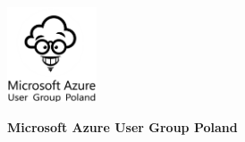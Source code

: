 \documentclass[\main/boa.tex]{subfiles}
\begin{document}
	
	\begin{minipage}[t]{0.915\textwidth}
		\center     
		\includegraphics[width=100px]{img/logos.bw/microsoft_azure.png} 
	\end{minipage}
	\begin{center}
	\Large \textbf {Microsoft Azure User Group Poland}
	\end{center}
	
	\vskip 0.3cm
	\normalsize 

	\vskip 1.5cm
\end{document}
